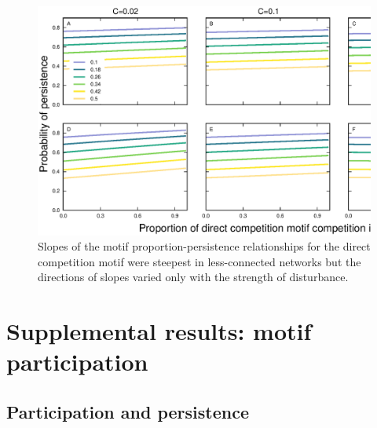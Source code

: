 \documentclass[12pt]{article}
\begin{document}
\begin{spacing}{2.0}
    \begin{figure}[hb!]
        \centering
        \includegraphics[width=\textwidth]{figures/persistence_direct_detailpers.eps}
        \caption{Slopes of the motif proportion-persistence relationships for the direct competition motif were steepest in less-connected networks but the directions of slopes varied only with the strength of disturbance.}
        \label{direct_plus_SC}
        \end{figure}
    

\clearpage


\section{Supplemental results: motif participation} 

    \subsection{Participation and persistence}



\end{spacing}
\end{document}
